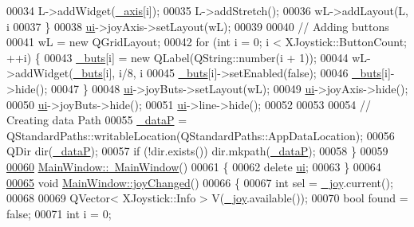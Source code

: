 \begin{DoxyCode}
00034         L->addWidget(\hyperlink{a00004_a30c99d7a544f74b0650758e5cc7ead5a}{\_axis}[i]);
00035         L->addStretch();
00036         wL->addLayout(L, i%
00037     \}
00038     \hyperlink{a00004_a35466a70ed47252a0191168126a352a5}{ui}->joyAxis->setLayout(wL);
00039     
00040     \textcolor{comment}{// Adding buttons}
00041     wL = \textcolor{keyword}{new} QGridLayout;
00042     \textcolor{keywordflow}{for} (\textcolor{keywordtype}{int} i = 0; i < XJoystick::ButtonCount; ++i) \{
00043         \hyperlink{a00004_a8eaf474e1b8672f32873ed009e28ce8a}{\_buts}[i] = \textcolor{keyword}{new} QLabel(QString::number(i + 1));
00044         wL->addWidget(\hyperlink{a00004_a8eaf474e1b8672f32873ed009e28ce8a}{\_buts}[i], i/8, i%
00045         \hyperlink{a00004_a8eaf474e1b8672f32873ed009e28ce8a}{\_buts}[i]->setEnabled(\textcolor{keyword}{false});
00046         \hyperlink{a00004_a8eaf474e1b8672f32873ed009e28ce8a}{\_buts}[i]->hide();
00047     \}
00048     \hyperlink{a00004_a35466a70ed47252a0191168126a352a5}{ui}->joyButs->setLayout(wL);
00049     \hyperlink{a00004_a35466a70ed47252a0191168126a352a5}{ui}->joyAxis->hide();
00050     \hyperlink{a00004_a35466a70ed47252a0191168126a352a5}{ui}->joyButs->hide();
00051     \hyperlink{a00004_a35466a70ed47252a0191168126a352a5}{ui}->line->hide();
00052     
00053     
00054     \textcolor{comment}{// Creating data Path    }
00055     \hyperlink{a00004_aaccbe653019df03668429890e325ac21}{\_dataP} = QStandardPaths::writableLocation(QStandardPaths::AppDataLocation);
00056     QDir dir(\hyperlink{a00004_aaccbe653019df03668429890e325ac21}{\_dataP});
00057     \textcolor{keywordflow}{if} (!dir.exists()) dir.mkpath(\hyperlink{a00004_aaccbe653019df03668429890e325ac21}{\_dataP});
00058 \}
00059 
\hypertarget{a00015_source_l00060}{}\hyperlink{a00004_ae98d00a93bc118200eeef9f9bba1dba7}{00060} \hyperlink{a00004_ae98d00a93bc118200eeef9f9bba1dba7}{MainWindow::~MainWindow}()
00061 \{
00062     \textcolor{keyword}{delete} \hyperlink{a00004_a35466a70ed47252a0191168126a352a5}{ui};
00063 \}
00064 
\hypertarget{a00015_source_l00065}{}\hyperlink{a00004_abb4c2d8a79c9f80010ea031366bf8226}{00065} \textcolor{keywordtype}{void} \hyperlink{a00004_abb4c2d8a79c9f80010ea031366bf8226}{MainWindow::joyChanged}()
00066 \{
00067     \textcolor{keywordtype}{int} sel = \hyperlink{a00004_a671f35800890e518713e1946671d8730}{\_joy}.current();
00068     
00069     QVector< XJoystick::Info > V(\hyperlink{a00004_a671f35800890e518713e1946671d8730}{\_joy}.available());
00070     \textcolor{keywordtype}{bool} found = \textcolor{keyword}{false};
00071     \textcolor{keywordtype}{int} i = 0;

\end{DoxyCode}
